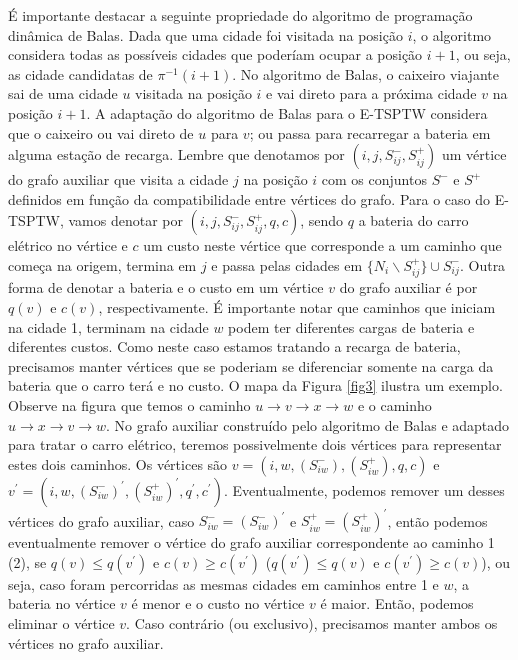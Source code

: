 \documentclass{article}
\begin{document}
É importante destacar a seguinte propriedade do algoritmo de programação dinâmica de Balas. Dada que uma cidade foi visitada na posição $i$, o algoritmo considera todas as possíveis cidades que poderíam ocupar a posição $i+1$, ou seja, as cidade candidatas de $\pi^{-1}(i+1)$. No algoritmo de Balas, o caixeiro viajante sai de uma cidade $u$ visitada na posição $i$ e vai direto para a próxima cidade $v$ na posição $i+1$. A adaptação do algoritmo de Balas para o E-TSPTW considera que o caixeiro ou vai direto de $u$ para $v$; ou passa para recarregar a bateria em alguma estação de recarga. Lembre que denotamos por $(i,j,S^-_{ij},S^+_{ij})$ um vértice do grafo auxiliar que visita a cidade $j$ na posição $i$ com os conjuntos $S^-$ e $S^+$ definidos em função da compatibilidade entre vértices do grafo. Para o caso do E-TSPTW, vamos denotar por $(i, j, S^-_{ij}, S^+_{ij}, q, c)$, sendo $q$ a bateria do carro elétrico no vértice e $c$ um custo neste vértice que corresponde a um caminho que começa na origem, termina em $j$ e passa pelas cidades em $\{N_{i} \backslash S^+_{ij}\} \cup S^-_{ij}$. Outra forma de denotar a bateria e o custo em um vértice $v$ do grafo auxiliar é por $q(v)$ e $c(v)$, respectivamente. É importante notar que caminhos que iniciam na cidade 1, terminam na cidade $w$ podem ter diferentes cargas de bateria e diferentes custos. Como neste caso estamos tratando a recarga de bateria, precisamos manter vértices que se poderiam se diferenciar somente na carga da bateria que o carro terá e no custo. O mapa da Figura \ref{fig3} ilustra um exemplo. Observe na figura que temos o caminho $u \rightarrow v \rightarrow x \rightarrow w$ e o caminho $u  \rightarrow x  \rightarrow v  \rightarrow w$. No grafo auxiliar construído pelo algoritmo de Balas e adaptado para tratar o carro elétrico, teremos possivelmente dois vértices para representar estes dois caminhos. Os vértices são $v=(i, w, (S^-_{iw}), (S^+_{iw}), q, c)$ e $v^{\prime}=(i, w, (S^-_{iw})^{\prime}, (S^+_{iw})^\prime, q^\prime, c^\prime)$. Eventualmente, podemos remover um desses vértices do grafo auxiliar, caso $S^-_{iw} = (S^-_{iw})^\prime$ e $S^+_{iw} = (S^+_{iw})^\prime$, então podemos eventualmente remover o vértice do grafo auxiliar correspondente ao caminho 1 (2), se $q(v) \leq q(v^\prime)$ e $c(v) \geq c(v^\prime)$ ($q(v^\prime) \leq q(v)$ e $c(v^\prime) \geq c(v)$), ou seja, caso foram percorridas as mesmas cidades em caminhos entre 1 e $w$, a bateria no vértice $v$ é menor e o custo no vértice $v$ é maior. Então, podemos eliminar o vértice $v$. Caso contrário (ou exclusivo), precisamos manter ambos os vértices no grafo auxiliar. 
\end{document}
